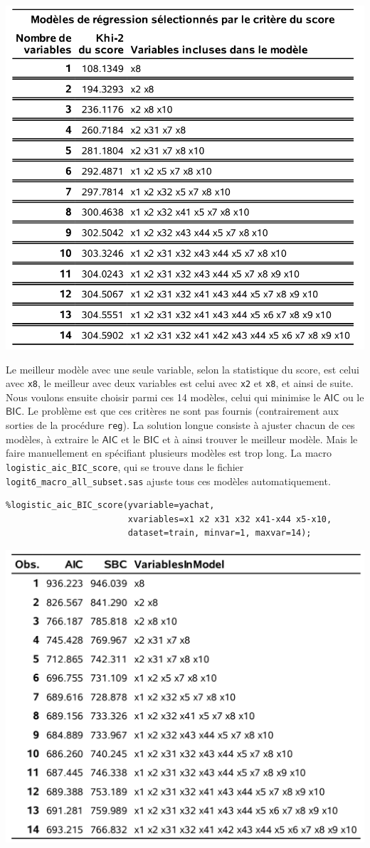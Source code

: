 \documentclass[
  11pt,
  letterpaper,
]{book}
\theoremstyle{definition}
\theoremstyle{definition}
\theoremstyle{definition}
\theoremstyle{remark}
\begin{document}
\begin{center}\includegraphics[width=0.8\linewidth]{figures/03-logistic-e20} \end{center}

Le meilleur modèle avec une seule variable, selon la statistique du score, est celui avec \texttt{x8}, le meilleur avec deux variables est celui avec \texttt{x2} et \texttt{x8}, et ainsi de suite. Nous voulons ensuite choisir parmi ces 14 modèles, celui qui minimise le \(\mathsf{AIC}\) ou le \(\mathsf{BIC}\). Le problème est que ces critères ne sont pas fournis (contrairement aux sorties de la procédure \texttt{reg}). La solution longue consiste à ajuster chacun de ces modèles, à extraire le \(\mathsf{AIC}\) et le \(\mathsf{BIC}\) et à ainsi trouver le meilleur modèle. Mais le faire manuellement en spécifiant plusieurs modèles est trop long. La macro \texttt{logistic\_aic\_BIC\_score}, qui se trouve dans le fichier \texttt{logit6\_macro\_all\_subset.sas} ajuste tous ces modèles automatiquement.

\begin{verbatim}
%logistic_aic_BIC_score(yvariable=yachat,
                        xvariables=x1 x2 x31 x32 x41-x44 x5-x10,
                        dataset=train, minvar=1, maxvar=14);
\end{verbatim}

\begin{center}\includegraphics[width=0.8\linewidth]{figures/03-logistic-e21} \end{center}
\end{document}
